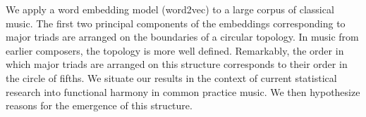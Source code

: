 We apply a word embedding model (word2vec) to a large corpus of classical music.
The first two principal components of the embeddings corresponding to major triads are arranged on the boundaries of a circular topology. In music from earlier composers, the topology is more well defined. Remarkably, the order in which major triads are arranged on this structure corresponds to their order in the circle of fifths. We situate our results in the context of current statistical research into functional harmony in common practice music. We then hypothesize reasons for the emergence of this structure.

